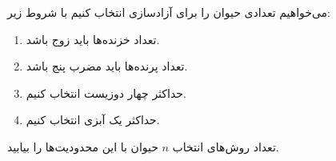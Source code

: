    \p 
می‌خواهیم تعدادی حیوان را برای آزادسازی انتخاب کنیم با شروط زیر:
\begin{enumerate}
\item
تعداد خزنده‌ها باید زوج باشد.
\item
تعداد پرنده‌ها باید مضرب پنج باشد.
\item
حداکثر چهار دوزیست انتخاب کنیم.
\item
حداکثر یک آبزی انتخاب کنیم.
\end{enumerate}
تعداد روش‌های انتخاب
$n$
حیوان با این محدودیت‌ها را بیابید.